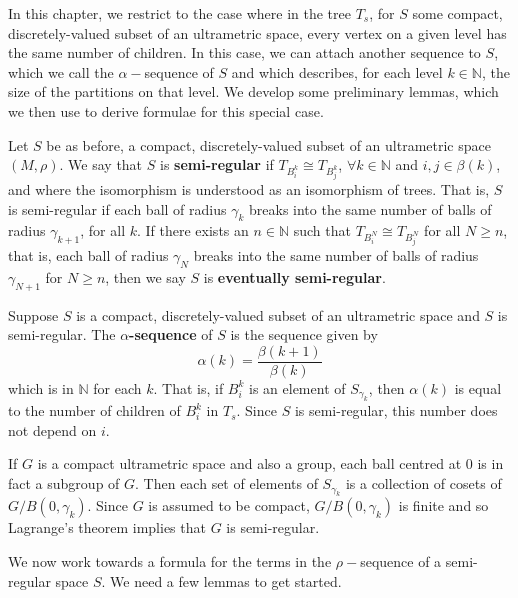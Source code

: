 In this chapter, we restrict to the case where in the tree $T_s$, for $S$ some compact, discretely-valued subset of an ultrametric space, every vertex on a given level has the same number of children. In this case, we can attach another sequence to $S$, which we call the $\alpha-$sequence of $S$ and which describes, for each level $k \in \mathbb{N}$, the size of the partitions on that level. We develop some preliminary lemmas, which we then use to derive formulae for this special case.

\begin{definition}
Let $S$ be as before, a compact, discretely-valued subset of an ultrametric space $(M, \rho)$. We say that $S$ is \textbf{semi-regular} if $T_{B^k_i} \cong T_{B^k_j}$, $\forall k \in \mathbb{N}$ and  $i,j \in \beta(k)$, and where the isomorphism is understood as an isomorphism of trees. That is, $S$ is semi-regular if each ball of radius $\gamma_k$ breaks into the same number of balls of radius $\gamma_{k+1}$, for all $k$. If there exists an $n \in \mathbb{N}$ such that $T_{B^N_i} \cong T_{B^N_j}$ for all $N \geq n$, that is,  each ball of radius $\gamma_N$ breaks into the same number of balls of radius $\gamma_{N+1}$ for $N \geq n$, then we say $S$ is \textbf{eventually semi-regular}.
\end{definition}

\begin{definition}
Suppose $S$ is a compact, discretely-valued subset of an ultrametric space and $S$ is semi-regular. The \textbf{$\alpha$-sequence} of $S$ is the sequence given by \[\alpha(k)=\frac{\beta(k+1)}{\beta(k)}\] which is in $\mathbb{N}$ for each $k$. That is, if $B^k_i$ is an element of $S_{\gamma_k}$, then $\alpha(k)$ is equal to the number of children of $B^k_i$ in $T_s$. Since $S$ is semi-regular, this number does not depend on $i$.
\end{definition}

\begin{example}
	If $G$ is a compact ultrametric space and also a group, each ball centred at $0$ is in fact a subgroup of $G$. Then each set of elements of $S_{\gamma_k}$ is a collection of cosets of $G/B(0,\gamma_k)$. Since $G$ is assumed to be compact, $G/B(0,\gamma_k)$ is finite and so Lagrange's theorem implies that $G$ is semi-regular.
\end{example}

We now work towards a formula for the terms in the $\rho-$sequence of a semi-regular space $S$. We need a few lemmas to get started.\\
 
